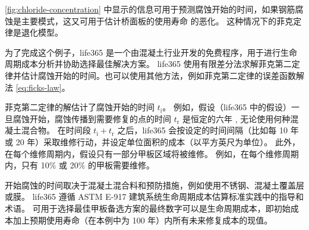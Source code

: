 \cref{fig:chloride-concentration} 中显示的信息可用于预测腐蚀开始的时间，如果钢筋腐蚀是主要模式，这又可用于估计桥面板的使用寿命 的恶化。 这种情况下的菲克定律是退化模型。

为了完成这个例子，\gls{life365} 是一个由混凝土行业开发的免费程序，用于进行生命周期成本分析并协助选择最佳解决方案。 \gls{life365} 使用有限差分法求解菲克第二定律并估计腐蚀开始的时间。也可以使用其他方法，例如菲克第二定律的误差函数解法 \cref{eq:ficks-law}。

菲克第二定律的解估计了腐蚀开始的时间 $t_\text{i}$。 例如，假设（\gls{life365} 中的假设）一旦腐蚀开始，腐蚀传播到需要修复的点的时间 $t_\text{r}$ 是恒定的六年 , 无论使用何种混凝土混合物。 在时间段 $t_\text{i} + t_\text{r}$ 之后，\gls{life365} 会按设定的时间间隔（比如每 10 年或 20 年）采取维修行动，并设定单位面积的成本（以平方英尺为单位）。 此外，在每个维修周期内，假设只有一部分甲板区域将被维修。 例如，在每个维修周期内，只有 10\% 或 20\% 的甲板需要维修。

开始腐蚀的时间取决于混凝土混合料和预防措施，例如使用不锈钢、混凝土覆盖层或膜。 \gls{life365} 遵循 ASTM E-917 建筑系统生命周期成本估算标准实践中的指导和术语。 可用于选择最佳甲板备选方案的最终数字可以是生命周期成本，即初始成本加上预期使用寿命（在本例中为 100 年）内所有未来修复成本的现值。

